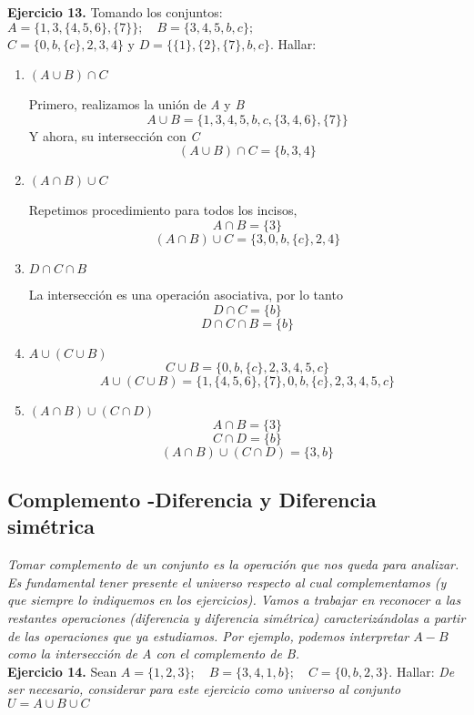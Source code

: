 \textbf{Ejercicio 13.} Tomando los conjuntos: $A = \{1, 3, \{4, 5, 6\}, \{7\}\}; \quad B = \{ 3, 4, 5, b, c \};$ $C = \{ 0, b, \{c\}, 2, 3, 4 \} \text{ y } D = \{ \{1\}, \{2\}, \{7\}, b, c \}$. Hallar:

\begin{enumerate}
	\item $(A \cup B) \cap C$
	
	Primero, realizamos la uni\'on de \textit{A} y \textit{B} $$A \cup B = \{ 1, 3, 4, 5, b, c, \{3, 4, 6\}, \{7\} \}$$ Y ahora, su intersecci\'on con \textit{C} $$(A \cup B) \cap C = \{b, 3, 4\}$$
	
	\item $(A \cap B)\cup C$
	
	Repetimos procedimiento para todos los incisos, $$A \cap B = \{ 3 \}$$ $$(A \cap B)\cup C = \{3, 0, b, \{c\}, 2, 4\}$$
	
	\item $D \cap C \cap B$
	
	La intersecci\'on es una operaci\'on asociativa, por lo tanto $$D \cap C = \{b\}$$ $$D \cap C \cap B = \{b\}$$
	
	\item $A \cup (C \cup B)$
	$$C \cup B = \{0, b, \{c\}, 2, 3, 4, 5, c\}$$ $$A \cup (C \cup B) = \{1, \{4, 5, 6\}, \{7\}, 0, b, \{c\}, 2, 3, 4, 5, c\}$$
	
	\item $(A \cap B)\cup(C \cap D)$
	$$A \cap B = \{3\}$$ $$C \cap D = \{b\}$$ $$(A \cap B)\cup(C \cap D) = \{3, b\}$$
\end{enumerate}

\subsection{Complemento -Diferencia y Diferencia simétrica}

\textit{Tomar complemento de un conjunto es la operación que nos queda para analizar. Es fundamental tener presente
el universo respecto al cual complementamos (y que siempre lo indiquemos en los ejercicios). Vamos a trabajar en
reconocer a las restantes operaciones (diferencia y diferencia simétrica) caracterizándolas a partir de las operaciones
que ya estudiamos. Por ejemplo, podemos interpretar $A - B$ como la intersección de A con el complemento de B.}\\

\textbf{Ejercicio 14.} Sean $A = \{1, 2, 3\}; \quad B = \{3, 4, 1, b\}; \quad C = \{0, b, 2, 3\}$. Hallar: \textit{De ser necesario, considerar para este ejercicio como universo al conjunto $U = A \cup B \cup C$} 

